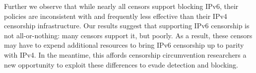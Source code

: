 Further we observe that while nearly all censors support blocking IPv6, their
policies are inconsistent with and frequently less effective than their IPv4
censorship infrastructure. Our results suggest that supporting IPv6 censorship
is not all-or-nothing: many censors support it, but poorly.  As a result, these
censors may have to expend additional resources to bring IPv6 censorship up to
parity with IPv4. In the meantime, this affords censorship circumvention
researchers a new opportunity to exploit these differences to evade detection
and blocking.
\fi
